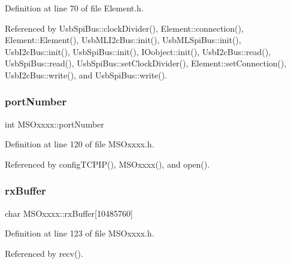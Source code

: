 Definition at line 70 of file Element.\+h.



Referenced by Usb\+Spi\+Bus\+::clock\+Divider(), Element\+::connection(), Element\+::\+Element(), Usb\+M\+L\+I2c\+Bus\+::init(), Usb\+M\+L\+Spi\+Bus\+::init(), Usb\+I2c\+Bus\+::init(), Usb\+Spi\+Bus\+::init(), I\+Oobject\+::init(), Usb\+I2c\+Bus\+::read(), Usb\+Spi\+Bus\+::read(), Usb\+Spi\+Bus\+::set\+Clock\+Divider(), Element\+::set\+Connection(), Usb\+I2c\+Bus\+::write(), and Usb\+Spi\+Bus\+::write().

\mbox{\label{classMSOxxxx_a242bcf72c701cd20d86d25315fc6180f}} 
\subsubsection{\texorpdfstring{port\+Number}{portNumber}}
{\footnotesize\ttfamily int M\+S\+Oxxxx\+::port\+Number\hspace{0.3cm}{\ttfamily [private]}}



Definition at line 120 of file M\+S\+Oxxxx.\+h.



Referenced by config\+T\+C\+P\+I\+P(), M\+S\+Oxxxx(), and open().

\mbox{\label{classMSOxxxx_a1a50770759caada18087ca8ffb96f357}} 
\subsubsection{\texorpdfstring{rx\+Buffer}{rxBuffer}}
{\footnotesize\ttfamily char M\+S\+Oxxxx\+::rx\+Buffer\mbox{[}10485760\mbox{]}\hspace{0.3cm}{\ttfamily [private]}}



Definition at line 123 of file M\+S\+Oxxxx.\+h.



Referenced by recv().

\mbox{\label{classMSOxxxx_a847cae37181e9ec5f481edcc3fb19b1a}} 
